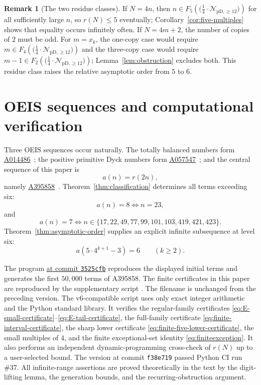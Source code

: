 \documentclass[12pt]{article}
\theoremstyle{plain}
\theoremstyle{definition}
\newtheorem{remark}[theorem]{Remark}
\theoremstyle{plain}
\newcommand{\Pset}{%
  \bigl(\tfrac{1}{4}\cdot\mathcal{N}_{\mathrm{pD},\geq 12}\bigr)%
}
\newcommand{\seqnum}[1]{\href{https://oeis.org/#1}{\rm \underline{#1}}}
\begin{document}
\begin{remark}[The two residue classes]
If $N=4n$, then $n\in F_5(\Pset)$ for all sufficiently large $n$, so
$r(N)\leq5$ eventually; Corollary~\ref{cor:five-multiples} shows that
equality occurs infinitely often.  If $N=4m+2$, the number of copies of
$2$ must be odd.  For $m=x_k$, the one-copy case would require
$m\in F_4(\Pset)$ and the three-copy case would require
$m-1\in F_2(\Pset)$; Lemma~\ref{lem:obstruction} excludes both.  This
residue class raises the relative asymptotic order from $5$ to $6$.
\end{remark}

\section{OEIS sequences and computational verification}
\label{sec:oeis}

Three OEIS sequences occur naturally.  The totally balanced numbers form
\seqnum{A014486}~\cite{OEIS-A014486}; the positive primitive Dyck numbers
form \seqnum{A057547}~\cite{OEIS-A057547}; and the central sequence of
this paper is
\[
 a(n)=r(2n),
\]
namely \seqnum{A395858}~\cite{OEIS-A395858}.  Theorem~\ref{thm:classification}
determines all terms exceeding six:
\[
 a(n)=8\iff n=23,
\]
and
\[
 a(n)=7\iff
 n\in\{17,22,49,77,99,101,103,419,421,423\}.
\]
Theorem~\ref{thm:asymptotic-order} supplies an explicit infinite
subsequence at level six:
\begin{equation}\label{eq:A395858-six-subsequence}
 a(5\cdot4^{k+1}-3)=6\qquad(k\geq2).
\end{equation}

The program
\href{https://github.com/growupkuriyama-hub/lean_cfg_project/blob/3525cfb/LeanCfgProject/PrimDyck/A395858.py}
{ at commit \texttt{3525cfb}}
reproduces the displayed initial terms and generates the first $50{,}000$
terms of A395858.  The finite certificates in this paper are reproduced by
the supplementary script
\href{https://github.com/growupkuriyama-hub/lean_cfg_project/blob/f38e719/LeanCfgProject/PrimDyck/verify_certificates_for_paper.py}
{}.
The filename is unchanged from the preceding version.  The v6-compatible
script uses only exact integer arithmetic and the Python standard library.
It verifies the regular-family certificates
\eqref{eq:E-small-certificate}--\eqref{eq:E-tail-certificate}, the
full-family certificate \eqref{eq:finite-interval-certificate}, the sharp
lower certificate \eqref{eq:finite-five-lower-certificate}, the small
multiples of $4$, and the finite exceptional-set identity
\eqref{eq:finiteexception}.  It also performs an independent
dynamic-programming cross-check of $r(N)$ up to a user-selected bound.
The version at commit \texttt{f38e719} passed Python CI run \#37.  All
infinite-range assertions are proved theoretically in the text by the
digit-lifting lemma, the generation bounds, and the recurring-obstruction
argument.
\end{document}
